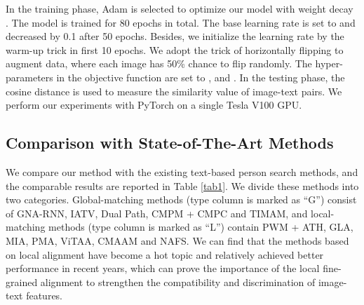 \documentclass[review]{elsarticle}
\begin{document}
In the training phase, Adam is selected to optimize our model with weight decay . The model is trained for 80 epochs in total. The base learning rate is set to  and decreased by 0.1 after 50 epochs. Besides, we initialize the learning rate by the warm-up trick in first 10 epochs. We adopt the trick of horizontally flipping to augment data, where each image has 50\% chance to flip randomly. The hyper-parameters in the objective function are set to ,  and . In the testing phase, the cosine distance is used to measure the similarity value of image-text pairs. We perform our experiments with PyTorch on a single Tesla V100 GPU.

\subsection{Comparison with State-of-The-Art Methods}
We compare our method with the existing text-based person search methods, and the comparable results are reported in Table \ref{tab1}. We divide these methods into two categories. Global-matching methods (type column is marked as “G”) consist of GNA-RNN, IATV, Dual Path, CMPM + CMPC and TIMAM, and local-matching methods (type column is marked as “L”) contain PWM + ATH, GLA, MIA, PMA, ViTAA, CMAAM and NAFS. We can find that the methods based on local alignment have become a hot topic and relatively achieved better performance in recent years, which can prove the importance of the local fine-grained alignment to strengthen the compatibility and discrimination of image-text features. 
\end{document}
